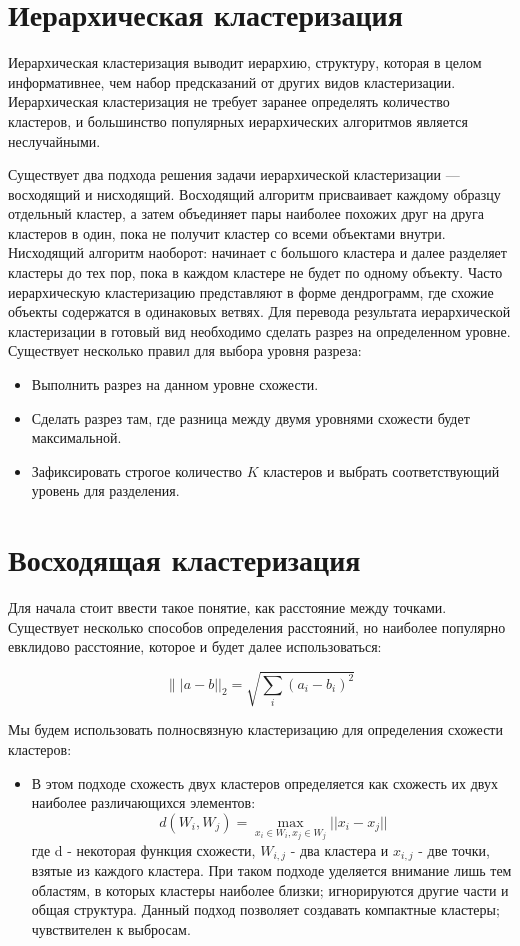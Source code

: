 \documentclass[12pt, a4paper]{article}
\begin{document}


\section*{Иерархическая кластеризация}


Иерархическая кластеризация выводит иерархию, структуру, которая в целом информативнее, чем набор предсказаний от других видов кластеризации. Иерархическая кластеризация не требует заранее определять количество кластеров, и большинство популярных иерархических алгоритмов является неслучайными. 

Существует два подхода решения задачи иерархической кластеризации — восходящий и нисходящий. Восходящий алгоритм присваивает каждому образцу отдельный кластер, 
а затем объединяет пары наиболее похожих друг на друга кластеров в один, пока не получит кластер со всеми объектами внутри. Нисходящий алгоритм наоборот: 
начинает с большого кластера и далее разделяет кластеры до тех пор, пока в каждом кластере не будет по одному объекту.
Часто иерархическую кластеризацию представляют в форме дендрограмм, 
где схожие объекты содержатся в одинаковых ветвях. Для перевода результата иерархической кластеризации в готовый вид необходимо сделать разрез на определенном уровне. Существует несколько правил для выбора уровня разреза:

\begin{itemize}
\item Выполнить разрез на данном уровне схожести.
\item Сделать разрез там, где разница между двумя уровнями схожести будет максимальной.
\item Зафиксировать строгое количество $K$ кластеров и выбрать соответствующий уровень для разделения.
\end{itemize}
   
\section*{Восходящая кластеризация}
Для начала стоит ввести такое понятие, как расстояние между точками. Существует несколько способов определения расстояний, но наиболее популярно евклидово расстояние, которое и будет далее использоваться:

\[
\||a-b||_2 = \sqrt{\sum_i (a_i-b_i)^2}
\]

Мы будем использовать полносвязную кластеризацию для определения схожести кластеров:

\begin{itemize}
\item В этом подходе схожесть двух кластеров определяется как схожесть их двух наиболее различающихся элементов:
\[
\ d(W_i, W_j) =  \max_{x_i \in W_i, x_j \in W_j} ||x_i - x_j||
\]
где d - некоторая функция схожести, $W_{i, j}$ - два кластера и $x_{i, j}$ - две точки, взятые из каждого кластера. При таком подходе уделяется внимание лишь тем областям, в которых кластеры наиболее близки; игнорируются другие части и общая структура.
Данный подход позволяет создавать компактные кластеры; чувствителен к выбросам.
\end{itemize}
\end{document}
